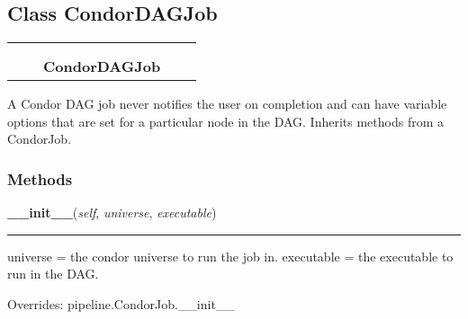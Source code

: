 \subsection{Class CondorDAGJob}

    \label{pipeline:CondorDAGJob}
\begin{tabular}{cccccc}
\multicolumn{2}{r}{\settowidth{\BCL}{pipeline.CondorJob}\multirow{2}{\BCL}{pipeline.CondorJob}}
&&
  \\\cline{3-3}
  &&\multicolumn{1}{c|}{}
&&
  \\
&&\multicolumn{2}{l}{\textbf{CondorDAGJob}}
\end{tabular}

A Condor DAG job never notifies the user on completion and can have 
variable options that are set for a particular node in the DAG. Inherits 
methods from a CondorJob.



  \subsubsection{Methods}

    \label{pipeline:CondorDAGJob:__init__}
    \vspace{0.5ex}

    \noindent\begin{boxedminipage}{\textwidth}

    \raggedright \textbf{\_\_init\_\_}(\textit{self}, \textit{universe}, \textit{executable})

    \vspace{-1.5ex}

    \rule{\textwidth}{0.5\fboxrule}
    universe = the condor universe to run the job in. executable = the 
    executable to run in the DAG.

    \vspace{1ex}

      Overrides: pipeline.CondorJob.\_\_init\_\_

    \end{boxedminipage}

    \label{pipeline:CondorDAGJob:add_var_arg}
    \vspace{0.5ex}

